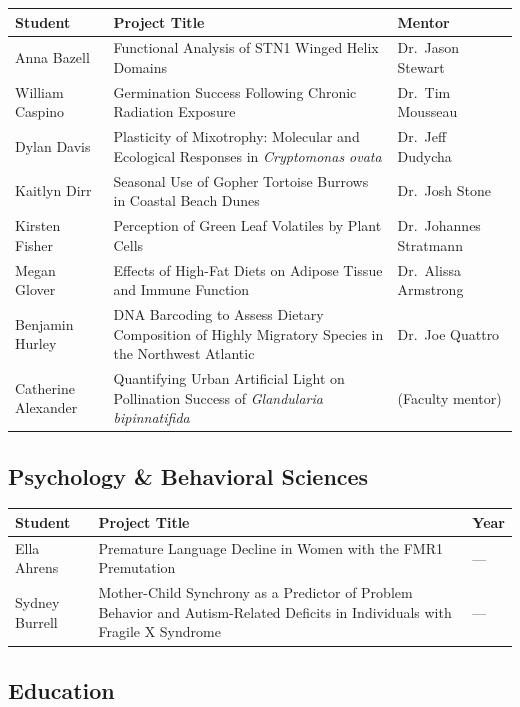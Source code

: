 \documentclass[11pt, letterpaper]{article}
\begin{document}
\begin{longtable}{@{}p{3.5cm} p{7cm} p{3.5cm}@{}}
\toprule
\textbf{Student} & \textbf{Project Title} & \textbf{Mentor} \\
\midrule
\endhead
Anna Bazell & Functional Analysis of STN1 Winged Helix Domains & Dr.\ Jason Stewart \\
William Caspino & Germination Success Following Chronic Radiation Exposure & Dr.\ Tim Mousseau \\
Dylan Davis & Plasticity of Mixotrophy: Molecular and Ecological Responses in \emph{Cryptomonas ovata} & Dr.\ Jeff Dudycha \\
Kaitlyn Dirr & Seasonal Use of Gopher Tortoise Burrows in Coastal Beach Dunes & Dr.\ Josh Stone \\
Kirsten Fisher & Perception of Green Leaf Volatiles by Plant Cells & Dr.\ Johannes Stratmann \\
Megan Glover & Effects of High-Fat Diets on Adipose Tissue and Immune Function & Dr.\ Alissa Armstrong \\
Benjamin Hurley & DNA Barcoding to Assess Dietary Composition of Highly Migratory Species in the Northwest Atlantic & Dr.\ Joe Quattro \\
Catherine Alexander & Quantifying Urban Artificial Light on Pollination Success of \emph{Glandularia bipinnatifida} & (Faculty mentor) \\
\bottomrule
\end{longtable}

\subsection{Psychology \& Behavioral Sciences}

\begin{longtable}{@{}p{3.5cm} p{9cm} p{2cm}@{}}
\toprule
\textbf{Student} & \textbf{Project Title} & \textbf{Year} \\
\midrule
\endhead
Ella Ahrens & Premature Language Decline in Women with the FMR1 Premutation & --- \\
Sydney Burrell & Mother-Child Synchrony as a Predictor of Problem Behavior and Autism-Related Deficits in Individuals with Fragile X Syndrome & --- \\
\bottomrule
\end{longtable}

\subsection{Education}
\end{document}
